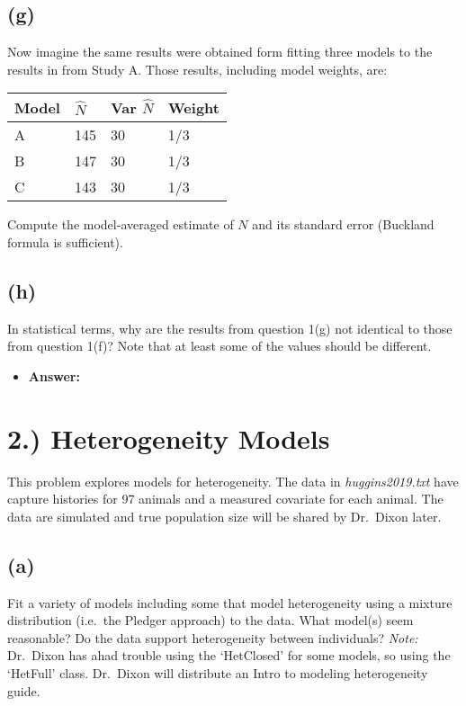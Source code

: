 \documentclass[]{article}
\providecommand{\tightlist}{%
  \setlength{\itemsep}{0pt}\setlength{\parskip}{0pt}}
\begin{document}
\subsection{(g)}\label{g}

Now imagine the same results were obtained form fitting three models to
the results in from Study A. Those results, including model weights,
are:

\begin{longtable}[]{@{}llll@{}}
\toprule
Model & \(\hat{N}\) & Var \(\hat{N}\) & Weight\tabularnewline
\midrule
\endhead
A & 145 & 30 & 1/3\tabularnewline
B & 147 & 30 & 1/3\tabularnewline
C & 143 & 30 & 1/3\tabularnewline
\bottomrule
\end{longtable}

Compute the model-averaged estimate of \(N\) and its standard error
(Buckland formula is sufficient).

\subsection{(h)}\label{h}

In statistical terms, why are the results from question 1(g) not
identical to those from question 1(f)? Note that at least some of the
values should be different.

\begin{itemize}
\tightlist
\item
  \textbf{Answer:}
\end{itemize}

\section{2.) Heterogeneity Models}\label{heterogeneity-models}

This problem explores models for heterogeneity. The data in
\emph{huggins2019.txt} have capture histories for 97 animals and a
measured covariate for each animal. The data are simulated and true
population size will be shared by Dr.~Dixon later.

\subsection{(a)}\label{a-1}

Fit a variety of models including some that model heterogeneity using a
mixture distribution (i.e.~the Pledger approach) to the data. What
model(s) seem reasonable? Do the data support heterogeneity between
individuals? \emph{Note:} Dr.~Dixon has ahad trouble using the
`HetClosed' for some models, so using the `HetFull' class. Dr.~Dixon
will distribute an Intro to modeling heterogeneity guide.
\end{document}
